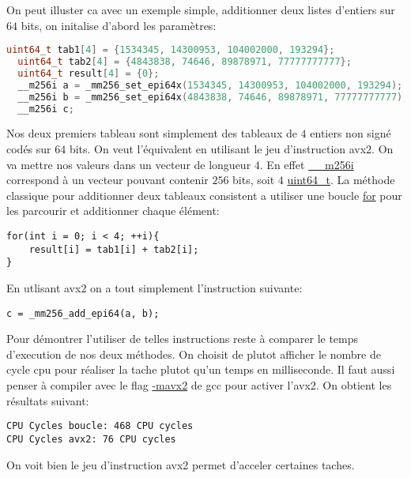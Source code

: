 \documentclass[12pt]{article}
\begin{document}
On peut illuster ca avec un exemple simple, additionner deux listes d'entiers sur $64$ bits, on initalise d'abord les paramètres:
\medskip
\begin{lstlisting}[language = c]
  uint64_t tab1[4] = {1534345, 14300953, 104002000, 193294};
  uint64_t tab2[4] = {4843838, 74646, 89878971, 77777777777};
  uint64_t result[4] = {0};
  __m256i a = _mm256_set_epi64x(1534345, 14300953, 104002000, 193294);
  __m256i b = _mm256_set_epi64x(4843838, 74646, 89878971, 77777777777);
  __m256i c;
\end{lstlisting}
Nos deux premiers tableau sont simplement des tableaux de $4$ entiers non signé codés sur $64$ bits. On veut l'équivalent en utilisant le jeu d'instruction avx2. On va mettre nos valeurs dans un vecteur de longueur $4$. En effet \url{__m256i} correspond à un vecteur pouvant contenir $256$ bits, soit $4$ \url{uint64_t}.
La méthode classique pour additionner deux tableaux consistent a utiliser une boucle \url{for} pour les parcourir et additionner chaque élément:
\medskip
\begin{lstlisting}
for(int i = 0; i < 4; ++i){
    result[i] = tab1[i] + tab2[i];
}
\end{lstlisting}
En utlisant avx2 on a tout simplement l'instruction suivante:
\medskip
\begin{lstlisting}
c = _mm256_add_epi64(a, b);
\end{lstlisting}
Pour démontrer l'utiliser de telles instructions reste à comparer le temps d'execution de nos deux méthodes. On choisit de plutot afficher le nombre de cycle cpu pour réaliser la tache plutot qu'un temps en milliseconde. Il faut aussi penser à compiler avec le flag \url{-mavx2} de gcc pour activer l'avx2. On obtient les résultats suivant:
\begin{lstlisting}
CPU Cycles boucle: 468 CPU cycles
CPU Cycles avx2: 76 CPU cycles
\end{lstlisting}
On voit bien le jeu d'instruction avx2 permet d'acceler certaines taches.
\newpage
%
%
\end{document}
